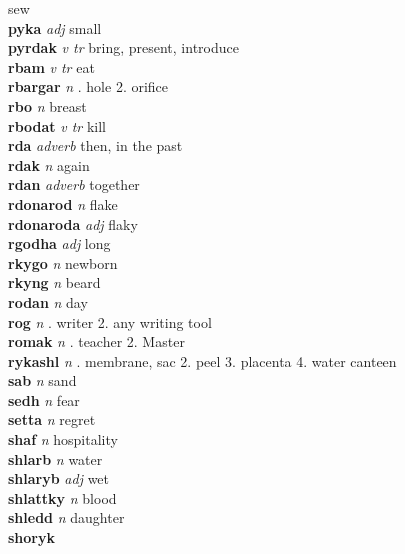 \textperiodcentered sew\\\textbf{pyka}   \emph{adj} \textperiodcentered small\\\textbf{pyrdak}   \emph{v tr} \textperiodcentered bring, present, introduce\\\textbf{rbam}   \emph{v tr} \textperiodcentered eat\\\textbf{rbargar}   \emph{n} . hole 2. orifice \\\textbf{rbo}   \emph{n} \textperiodcentered breast\\\textbf{rbodat}   \emph{v tr} \textperiodcentered kill\\\textbf{rda}   \emph{adverb} \textperiodcentered then, in the past\\\textbf{rdak}   \emph{n} \textperiodcentered again\\\textbf{rdan}   \emph{adverb} \textperiodcentered together\\\textbf{rdonarod}   \emph{n} \textperiodcentered flake\\\textbf{rdonaroda}   \emph{adj} \textperiodcentered flaky\\\textbf{rgodha}   \emph{adj} \textperiodcentered long\\\textbf{rkygo}   \emph{n} \textperiodcentered newborn\\\textbf{rkyng}   \emph{n} \textperiodcentered beard\\\textbf{rodan}   \emph{n} \textperiodcentered day\\\textbf{rog}   \emph{n} . writer 2. any writing tool \\\textbf{romak}   \emph{n} . teacher 2. Master \\\textbf{rykashl}   \emph{n} . membrane, sac 2. peel 3. placenta 4. water canteen \\\textbf{sab}   \emph{n} \textperiodcentered sand\\\textbf{sedh}   \emph{n} \textperiodcentered fear\\\textbf{setta}   \emph{n} \textperiodcentered regret\\\textbf{shaf}   \emph{n} \textperiodcentered hospitality\\\textbf{shlarb}   \emph{n} \textperiodcentered water\\\textbf{shlaryb}   \emph{adj} \textperiodcentered wet\\\textbf{shlattky}   \emph{n} \textperiodcentered blood\\\textbf{shledd}   \emph{n} \textperiodcentered daughter\\\textbf{shoryk} 
